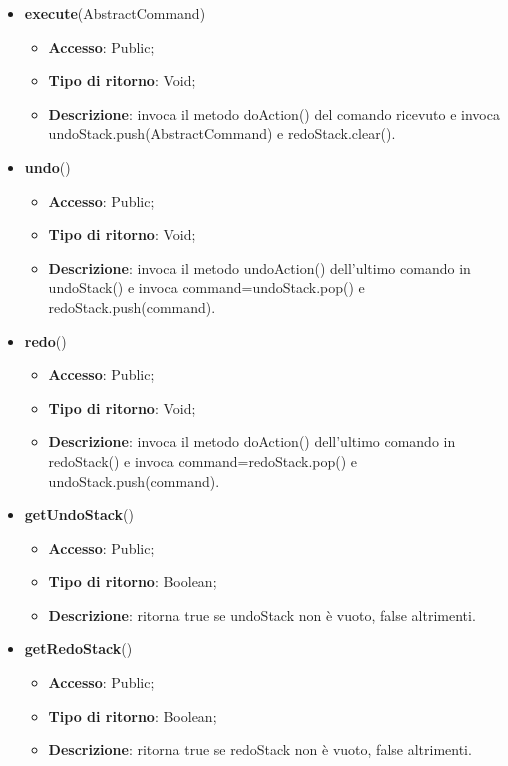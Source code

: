 {{\begin{itemize}
		\item \textbf{execute}(AbstractCommand)
		\begin{itemize}
			\item \textbf{Accesso}: Public;
			\item \textbf{Tipo di ritorno}: Void;
			\item \textbf{Descrizione}: invoca il metodo doAction() del comando ricevuto e invoca
			undoStack.push(AbstractCommand) e redoStack.clear().
		\end{itemize}
		\item \textbf{undo}()
		\begin{itemize}
			\item \textbf{Accesso}: Public;
			\item \textbf{Tipo di ritorno}: Void;
			\item \textbf{Descrizione}: invoca il metodo undoAction() dell’ultimo comando in undoStack() e invoca command=undoStack.pop() e redoStack.push(command).
		\end{itemize}
		\item \textbf{redo}()
		\begin{itemize}
			\item \textbf{Accesso}: Public;
			\item \textbf{Tipo di ritorno}: Void;
			\item \textbf{Descrizione}: invoca il metodo doAction() dell’ultimo comando in redoStack() e invoca command=redoStack.pop() e undoStack.push(command).
		\end{itemize}
		\item \textbf{getUndoStack}()
		\begin{itemize}
			\item \textbf{Accesso}: Public;
			\item \textbf{Tipo di ritorno}: Boolean;
			\item \textbf{Descrizione}: ritorna true se undoStack non è vuoto, false altrimenti.
		\end{itemize}
		\item \textbf{getRedoStack}()
		\begin{itemize}
			\item \textbf{Accesso}: Public;
			\item \textbf{Tipo di ritorno}: Boolean;
			\item \textbf{Descrizione}: ritorna true se redoStack non è vuoto, false altrimenti.
		\end{itemize}
	\end{itemize}
	
}}
